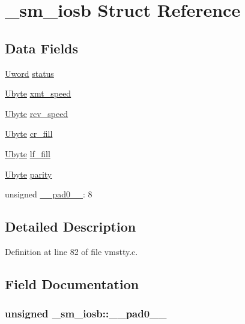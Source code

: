 \hypertarget{struct__sm__iosb}{\section{\+\_\+sm\+\_\+iosb Struct Reference}
\label{struct__sm__iosb}
}
\subsection*{Data Fields}
\begin{DoxyCompactItemize}
\item 
\hyperlink{vmstty_8c_a6124fd8a90b8b651aacc9d98026ad4e4}{Uword} \hyperlink{struct__sm__iosb_afff4b38c827f86942891823ba8b917ec}{status}
\item 
\hyperlink{vmstty_8c_ad63f4b09652b16512a7f3f814177ff65}{Ubyte} \hyperlink{struct__sm__iosb_a53275f08bd6534d558dd954f38c1ebe8}{xmt\+\_\+speed}
\item 
\hyperlink{vmstty_8c_ad63f4b09652b16512a7f3f814177ff65}{Ubyte} \hyperlink{struct__sm__iosb_a42baad496f74694a9e4045e5099ab0b2}{rcv\+\_\+speed}
\item 
\hyperlink{vmstty_8c_ad63f4b09652b16512a7f3f814177ff65}{Ubyte} \hyperlink{struct__sm__iosb_a0fa025e105b0cec813e09427e0169f58}{cr\+\_\+fill}
\item 
\hyperlink{vmstty_8c_ad63f4b09652b16512a7f3f814177ff65}{Ubyte} \hyperlink{struct__sm__iosb_ade9bfa02916307456ef5df26632f4019}{lf\+\_\+fill}
\item 
\hyperlink{vmstty_8c_ad63f4b09652b16512a7f3f814177ff65}{Ubyte} \hyperlink{struct__sm__iosb_a5aec1f01cbeb31fb9d9599e95a2cc8e7}{parity}
\item 
unsigned \hyperlink{struct__sm__iosb_a56e20fbd59c96064c554ac7d95e9445b}{\+\_\+\+\_\+pad0\+\_\+\+\_\+}\+: 8
\end{DoxyCompactItemize}


\subsection{Detailed Description}


Definition at line 82 of file vmstty.\+c.



\subsection{Field Documentation}
\hypertarget{struct__sm__iosb_a56e20fbd59c96064c554ac7d95e9445b}{
\subsubsection[{\+\_\+\+\_\+pad0\+\_\+\+\_\+}]{\setlength{\rightskip}{0pt plus 5cm}unsigned \+\_\+sm\+\_\+iosb\+::\+\_\+\+\_\+pad0\+\_\+\+\_\+}}\label{struct__sm__iosb_a56e20fbd59c96064c554ac7d95e9445b}


